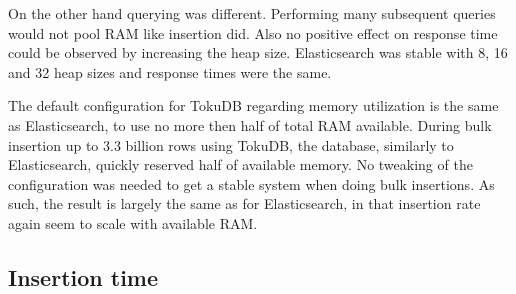 On the other hand querying was different. Performing many subsequent queries would not pool RAM like insertion did. Also no positive effect on response time could be observed by increasing the heap size. Elasticsearch was stable with 8, 16 and 32 heap sizes and response times were the same. 

The default configuration for TokuDB regarding memory utilization is the same as Elasticsearch, to use no more then half of total RAM available. During bulk insertion up to 3.3 billion rows using TokuDB, the database, similarly to Elasticsearch, quickly reserved half of available memory. No tweaking of the configuration was needed to get a stable system when doing bulk insertions. As such, the result is largely the same as for Elasticsearch, in that insertion rate again seem to scale with available RAM.


%
%

\subsection{Insertion time}

